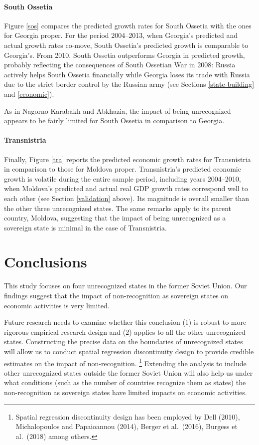 \documentclass[12pt,a4paper]{article}%
\begin{document}
\paragraph{South Ossetia}
Figure \ref{sos} compares the predicted growth rates for South Ossetia with the ones for Georgia proper.
For the period 2004--2013, when Georgia's predicted and actual growth rates co-move, South Ossetia's predicted growth is comparable to Georgia's.
From 2010, South Ossetia outperforms Georgia in predicted growth, probably reflecting the consequences of South Ossetian War in 2008: Russia actively helps South Ossetia financially while Georgia loses its trade with Russia due to the strict border control by the Russian army (see Sections \ref{state-building} and \ref{economic}).

As in Nagorno-Karabakh and Abkhazia, the impact of being unrecognized appears to be fairly limited for South Ossetia in comparison to Georgia.

\paragraph{Transnistria}
Finally, Figure \ref{tra} reports the predicted economic growth rates for Transnistria in comparison to those for Moldova proper. 
Transnistria's predicted economic growth is volatile during the entire sample period, including years 2004--2010, when Moldova's predicted and actual real GDP growth rates correspond well to each other (see Section \ref{validation} above). 
Its magnitude is overall smaller than the other three unrecognized states.
The same remarks apply to its parent country, Moldova, suggesting that the impact of being unrecognized as a sovereign state is minimal in the case of Transnistria.

\section{Conclusions}\label{conclusions}
This study focuses on four unrecognized states in the former Soviet Union. 
Our findings suggest that the impact of non-recognition as sovereign states on economic activities is very limited. 

Future research needs to examine whether this conclusion (1) is robust to more rigorous empirical research design and (2) applies to all the other unrecognized states. Constructing the precise data on the boundaries of unrecognized states will allow us to conduct spatial regression discontinuity design to provide credible estimates on the impact of non-recognition.%
\footnote{
	Spatial regression discontinuity design has been employed by Dell (2010), Michalopoulos and Papaioannou (2014), Berger et al.\ (2016), Burgess et al.\ (2018) among others.
}
Extending the analysis to include other unrecognized states outside the former Soviet Union will also help us under what conditions (such as the number of countries recognize them as states) the non-recognition as sovereign states have limited impacts on economic activities.
\end{document}
